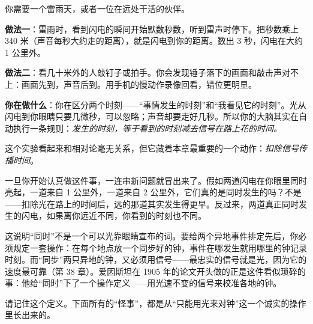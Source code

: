 
\begin{experiment}[看见不等于发生]
你需要一个雷雨天，或者一位在远处干活的伙伴。

\textbf{做法一}：雷雨时，看到闪电的瞬间开始默数秒数，听到雷声时停下。把秒数乘上 340 米（声音每秒大约走的距离），就是闪电到你的距离。数出 3 秒，闪电在大约 1 公里外。

\textbf{做法二}：看几十米外的人敲钉子或拍手。你会发现锤子落下的画面和敲击声对不上：画面先到，声音后到。用手机的慢动作录像回看，错位更明显。

\textbf{你在做什么}：你在区分两个时刻——“事情发生的时刻”和“我看见它的时刻”。光从闪电到你眼睛只要几微秒，可以忽略；声音却要走好几秒。所以你的大脑其实在自动执行一条规则：\emph{发生的时刻，等于看到的时刻减去信号在路上花的时间。}
\end{experiment}

\begin{mainline}
这个实验看起来和相对论毫无关系，但它藏着本章最重要的一个动作：\emph{扣除信号传播时间}。

一旦你开始认真做这件事，一连串新问题就冒出来了。假如两道闪电在你眼里同时亮起，一道来自 1 公里外，一道来自 2 公里外，它们真的是同时发生的吗？不是——扣除光在路上的时间后，远的那道其实发生得更早。反过来，两道真正同时发生的闪电，如果离你远近不同，你看到的时刻也不同。

这说明“同时”不是一个可以光靠眼睛宣布的词。要给两个异地事件排定先后，你必须规定一套操作：在每个地点放一个同步好的钟，事件在哪发生就用哪里的钟记录时刻。而“同步”两只异地的钟，又必须用信号——最忠实的信号就是光，因为它的速度最可靠（第 38 章）。爱因斯坦在 1905 年的论文开头做的正是这件看似琐碎的事：他给“同时”下了一个操作定义——用光速不变的信号来校准各地的钟。

请记住这个定义。下面所有的“怪事”，都是从“只能用光来对钟”这一个诚实的操作里长出来的。
\end{mainline}


